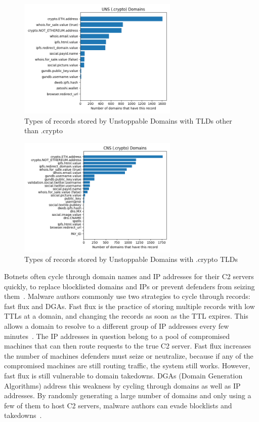 \documentclass[10pt,sigconf,letterpaper]{acmart}
\begin{document}
\begin{figure}[t]
	\centering
	\includegraphics[width=3in]{uns_records.png}
	\caption{Types of records stored by Unstoppable 
	Domains with TLDs other than .crypto}
	\label{fig:uns_records}
\end{figure}
\begin{figure}[t]
	\centering
	\includegraphics[width=3in]{cns_records.png}
	\caption{Types of records stored by Unstoppable Domains 
	with .crypto TLDs}
	\label{fig:cns_records}
\end{figure}

Botnets often cycle through domain names and IP addresses for their C2 servers quickly, to replace 
blocklisted domains and IPs or prevent defenders from seizing them~\cite{nadji_beheading_2013}. 
Malware authors commonly use two strategies to cycle through records: fast flux and DGAs. Fast flux 
is the practice of storing multiple records with low TTLs at a domain, and changing the records as 
soon as the TTL expires. This allows a domain to resolve to a different group of IP addresses every 
few minutes~\cite{holz_measuring_2008}. The IP addresses in question belong to a pool of 
compromised machines that can then route requests to the true C2 server. Fast flux increases the 
number of machines defenders must seize or neutralize, because if any of the compromised machines 
are still routing traffic, the system still works. However, fast flux is still vulnerable to domain 
takedowns. DGAs (Domain Generation Algorithms) address this weakness by cycling through domains as 
well as IP addresses. By randomly generating a large number of domains and only using a few of them 
to host C2 servers, malware authors can evade blocklists and  
takedowns~\cite{antonakakis_throw-away_2012}.
\end{document}
